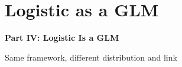 \documentclass[aspectratio=169]{beamer}
\begin{document}
\section{Logistic as a GLM}

\begin{frame}
\begin{center}
  \vspace{1.5cm}
  {\Huge\bfseries\textcolor{popblue}{Part IV: Logistic Is a GLM}}

  \vspace{0.8cm}
  {\large Same framework, different distribution and link}
\end{center}
\end{frame}
\end{document}
